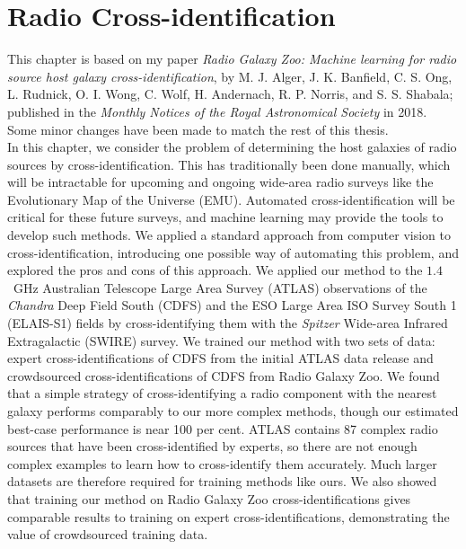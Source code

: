 \chapter{Radio Cross-identification}
\label{cha:cross-id}


This chapter is based on my paper \emph{Radio Galaxy Zoo: Machine learning for radio source host galaxy cross-identification}, by M. J. Alger, J. K. Banfield, C. S. Ong, L. Rudnick, O. I. Wong, C. Wolf, H. Andernach, R. P. Norris, and S. S. Shabala; published in the \emph{Monthly Notices of the Royal Astronomical Society} in 2018. Some minor changes have been made to match the rest of this thesis.\\

In this chapter, we consider the problem of determining the host galaxies of radio sources by cross-identification. This has traditionally been done manually, which will be intractable for upcoming and ongoing wide-area radio surveys like the Evolutionary Map of the Universe (EMU). {Automated cross-identification will be critical for these future surveys, and machine learning may provide the tools to develop such methods. We applied a standard approach from computer vision to cross-identification, introducing one possible way of automating this problem, and explored the pros and cons of this approach}. We applied our method to the $1.4$~GHz Australian Telescope Large Area Survey (ATLAS) observations of the \emph{Chandra} Deep Field South (CDFS) and the ESO Large Area ISO Survey South 1 (ELAIS-S1) fields by cross-identifying them with the \emph{Spitzer} Wide-area Infrared Extragalactic (SWIRE) survey. We trained our method with two sets of data: expert cross-identifications of CDFS from the initial ATLAS data release and crowdsourced cross-identifications of CDFS from Radio Galaxy Zoo. {We found that a simple strategy of cross-identifying a radio component with the nearest galaxy performs comparably to our more complex methods, though our estimated best-case performance is near 100 per cent. ATLAS contains 87 complex radio sources that have been cross-identified by experts, so there are not enough complex examples to learn how to cross-identify them accurately. Much larger datasets are therefore required for training methods like ours. We also showed that training our method on Radio Galaxy Zoo cross-identifications gives comparable results to training on expert cross-identifications, demonstrating the value of crowdsourced training data.}

